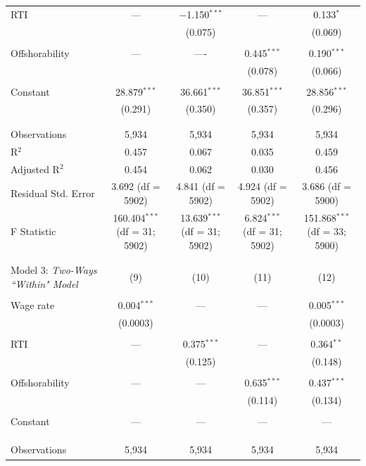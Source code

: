 \documentclass[undefended]{bumrp}
\begin{document}
\begin{landscape}
\begin{table}[!htbp]
\begin{tabular}{@{\extracolsep{5pt}}lcccc}
 RTI & --- & $-$1.150$^{***}$ & --- & 0.133$^{*}$ \\ 
  & & (0.075) & & (0.069) \\ 
  & & & & \\ 
 Offshorability & --- & ---- & 0.445$^{***}$ & 0.190$^{***}$ \\ 
  & & & (0.078) & (0.066) \\ 
  & & & & \\ 
 Constant & 28.879$^{***}$ & 36.661$^{***}$ & 36.851$^{***}$ & 28.856$^{***}$ \\ 
  & (0.291) & (0.350) & (0.357) & (0.296) \\ 
 & & & & \\
\hline \\[-1.8ex] 
Observations & 5,934 & 5,934 & 5,934 & 5,934 \\ 
R$^{2}$ & 0.457 & 0.067 & 0.035 & 0.459 \\ 
Adjusted R$^{2}$ & 0.454 & 0.062 & 0.030 & 0.456 \\
Residual Std.  Error & 3.692 (df = 5902) & 4.841 (df = 5902) & 4.924 (df = 5902) & 3.686 (df = 5900) \\
F Statistic & 160.404$^{***}$ (df = 31; 5902) & 13.639$^{***}$ (df = 31; 5902) & 6.824$^{***}$ (df = 31; 5902) & 151.868$^{***}$ (df = 33; 5900) \\
\hline 
\hline \\[-1.8ex]  
\\[-1.8ex] Model 3: \textit{Two-Ways ``Within" Model} & (9) & (10) & (11) & (12) \\
\hline \\[-1.8ex]
Wage rate & 0.004$^{***}$ & --- & --- & 0.005$^{***}$ \\ 
  & (0.0003) & & & (0.0003) \\ 
  & & & & \\ 
 RTI & --- & 0.375$^{***}$ & --- & 0.364$^{**}$ \\ 
  & & (0.125) & & (0.148) \\ 
  & & & & \\ 
 Offshorability & --- & --- & 0.635$^{***}$ & 0.437$^{***}$ \\ 
  & & & (0.114) & (0.134)\\ 
  & & & & \\ 
 Constant & --- & --- & --- & --- \\ 
  & & & & \\ 
 & & & & \\
\hline \\[-1.8ex] 
Observations & 5,934 & 5,934 & 5,934 & 5,934 \\ 

\end{tabular}
\end{table}
\end{landscape}
\end{document}
